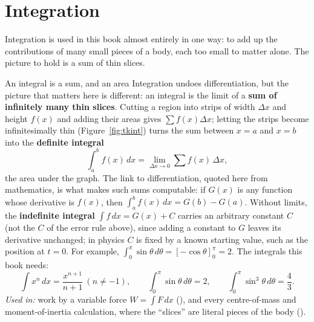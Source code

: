 \section{Integration}

Integration is used in this book almost entirely in one way: to add up the contributions of many small
pieces of a body, each too small to matter alone. The picture to hold is a sum of thin slices.

\begin{defbox}{An integral is a sum, and an area}
Integration undoes differentiation, but the picture that matters here is different: an integral is the
limit of a \textbf{sum of infinitely many thin slices}. Cutting a region into strips of width $\Delta x$
and height $f(x)$ and adding their areas gives $\sum f(x)\Delta x$; letting the strips become
infinitesimally thin (Figure~\ref{fig:tkint}) turns the sum between $x=a$ and $x=b$ into the \textbf{definite integral}
\[
\int_a^b f(x)\,dx=\lim_{\Delta x\to0}\sum f(x)\,\Delta x,
\]
the area under the graph. The link to differentiation, quoted here from mathematics, is what makes such
sums computable: if $G(x)$ is any function whose derivative is $f(x)$, then
$\int_a^b f(x)\,dx=G(b)-G(a)$. Without limits, the \textbf{indefinite integral} $\int f\,dx=G(x)+C$
carries an arbitrary constant $C$ (not the $C$ of the error rule above), since adding a constant to $G$ leaves its derivative unchanged; in
physics $C$ is fixed by a known starting value, such as the position at $t=0$. For example, $\int_0^{\pi}\sin\theta\,d\theta=[-\cos\theta]_0^{\pi}=2$.
The integrals this book needs:
\[
\int x^{n}\,dx=\frac{x^{n+1}}{n+1}\ (n\neq-1),\qquad
\int_0^{\pi}\sin\theta\,d\theta=2,\qquad
\int_0^{\pi}\sin^{3}\theta\,d\theta=\frac{4}{3}.
\]
\emph{Used in:} work by a variable force $W=\int F\,dx$ (), and every centre-of-mass and
moment-of-inertia calculation, where the ``slices'' are literal pieces of the body
().
\end{defbox}

\begin{figure}[htbp]
\centering
{}
\end{figure}

